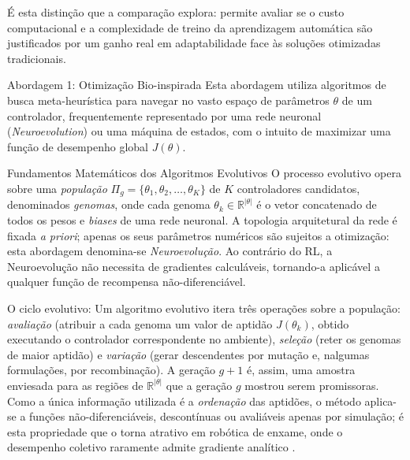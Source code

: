 \documentclass[12pt,reqno, twoside]{amsbook}
\makeatletter
\def\section{\@startsection{section}{1}%
      \z@{.5\linespacing\@plus.7\linespacing}{.25\linespacing}%
      {\normalfont\bfseries\flushleft}}
\def\subsection{\@startsection{subsection}{2}%
      \z@{.5\linespacing\@plus.7\linespacing}{.25\linespacing}%
      {\normalfont\bfseries\flushleft}}
\def\paragraph{\@startsection{paragraph}{4}%
  \z@\z@{-\fontdimen2\font}%
  {\normalfont\bfseries}}
\theoremstyle{plain}
\numberwithin{equation}{chapter}
\numberwithin{section}{chapter}
\numberwithin{table}{chapter}
\numberwithin{figure}{chapter}
\makeatother
\begin{document}
É esta distinção que a comparação explora: permite avaliar se o custo computacional e a complexidade de treino da aprendizagem automática são justificados por um ganho real em adaptabilidade face às soluções otimizadas tradicionais.

\section{Abordagem 1: Otimização Bio-inspirada}
Esta abordagem utiliza algoritmos de busca meta-heurística para navegar no vasto espaço de parâmetros $\theta$ de um controlador, frequentemente representado por uma rede neuronal (\textit{Neuroevolution}) ou uma máquina de estados, com o intuito de maximizar uma função de desempenho global $J(\theta)$.

\subsection{Fundamentos Matemáticos dos Algoritmos Evolutivos}
\label{sec:fundamentos_ae}
O processo evolutivo opera sobre uma \emph{população} $\Pi_g = \{\theta_1, \theta_2, \ldots, \theta_K\}$ de $K$ controladores candidatos, denominados \emph{genomas}, onde cada genoma $\theta_k \in \mathbb{R}^{|\theta|}$ é o vetor concatenado de todos os pesos e \textit{biases} de uma rede neuronal. A topologia arquitetural da rede é fixada \textit{a priori}; apenas os seus parâmetros numéricos são sujeitos a otimização: esta abordagem denomina-se \emph{Neuroevolução}. Ao contrário do RL, a Neuroevolução não necessita de gradientes calculáveis, tornando-a aplicável a qualquer função de recompensa não-diferenciável.

\paragraph{O ciclo evolutivo:}
Um algoritmo evolutivo itera três operações sobre a população: \emph{avaliação} (atribuir a cada genoma um valor de aptidão $J(\theta_k)$, obtido executando o controlador correspondente no ambiente), \emph{seleção} (reter os genomas de maior aptidão) e \emph{variação} (gerar descendentes por mutação e, nalgumas formulações, por recombinação). A geração $g+1$ é, assim, uma amostra enviesada para as regiões de $\mathbb{R}^{|\theta|}$ que a geração $g$ mostrou serem promissoras. Como a única informação utilizada é a \emph{ordenação} das aptidões, o método aplica-se a funções não-diferenciáveis, descontínuas ou avaliáveis apenas por simulação; é esta propriedade que o torna atrativo em robótica de enxame, onde o desempenho coletivo raramente admite gradiente analítico \cite{majid2023deep, bredeche2022social}.
\end{document}
